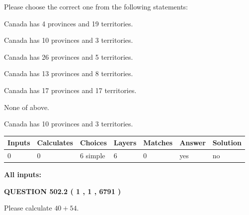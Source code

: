\documentclass[12pt]{article}
\begin{document}
  
Please choose the correct one from the following statements:
 
 
Canada has   4 provinces and  19 territories.
 
 
Canada has 10  provinces and 3 territories.
 
 
Canada has  26 provinces and  5 territories.
 
 
Canada has  13 provinces and  8 territories.
 
 
Canada has  17 provinces and  17 territories.
 
 
 None of above.
 
 
\noindent{}
 
 
Canada has 10  provinces and 3 territories.
 
 
\noindent{}
 
 
   
   
   
   
\noindent\begin{tabular}{|l|l|l|l|l|l|l|}
 \hline
Inputs & Calculates & Choices & Layers & Matches & Answer & Solution \\ \hline
 0  & 
 0  & 
 6
  simple  
  & 
 6  & 
 0  & 
  yes & 
  no 
  \\ \hline
 \end{tabular}
   
   
   
   
\noindent{}
   
   
   
   
\noindent\vspace{0.1in}\hspace{-0.08in} {\textbf{\Large{All inputs: }}}
   
   
  
\vspace{0.2in}
  
{\textbf{\Large{QUESTION
502.2 
 ( 1 , 1 , 6791 )
}}}
  
  
 
Please calculate $ %
40 +  %
54 $.
 
 
   
\end{document}
